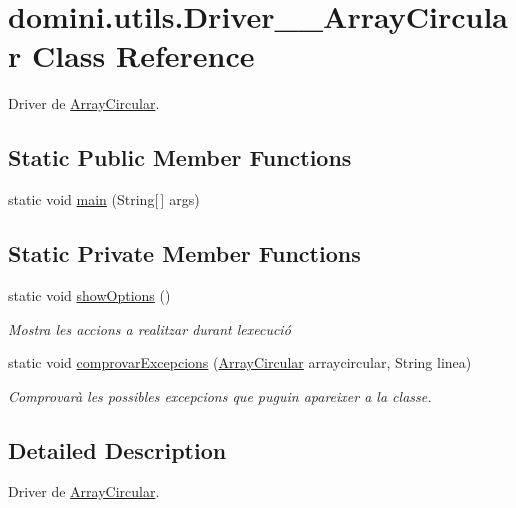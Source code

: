 \hypertarget{classdomini_1_1utils_1_1Driver____ArrayCircular}{}\section{domini.\+utils.\+Driver\+\_\+\+\_\+\+Array\+Circular Class Reference}
\label{classdomini_1_1utils_1_1Driver____ArrayCircular}


Driver de \hyperlink{classdomini_1_1utils_1_1ArrayCircular}{Array\+Circular}.  


\subsection*{Static Public Member Functions}
\begin{DoxyCompactItemize}
\item 
static void \hyperlink{classdomini_1_1utils_1_1Driver____ArrayCircular_adf8b1dedd521248da8a5f1425dd27af8}{main} (String\mbox{[}$\,$\mbox{]} args)
\end{DoxyCompactItemize}
\subsection*{Static Private Member Functions}
\begin{DoxyCompactItemize}
\item 
static void \hyperlink{classdomini_1_1utils_1_1Driver____ArrayCircular_afac5a37f91b2914e692993e71c2d393c}{show\+Options} ()
\begin{DoxyCompactList}\small\item\em Mostra les accions a realitzar durant l\textquotesingle{}execució \end{DoxyCompactList}\item 
static void \hyperlink{classdomini_1_1utils_1_1Driver____ArrayCircular_a0f5f42c5ace9176cfcae4dfe9717f380}{comprovar\+Excepcions} (\hyperlink{classdomini_1_1utils_1_1ArrayCircular}{Array\+Circular} arraycircular, String linea)
\begin{DoxyCompactList}\small\item\em Comprovarà les possibles excepcions que puguin apareixer a la classe. \end{DoxyCompactList}\end{DoxyCompactItemize}


\subsection{Detailed Description}
Driver de \hyperlink{classdomini_1_1utils_1_1ArrayCircular}{Array\+Circular}. 

